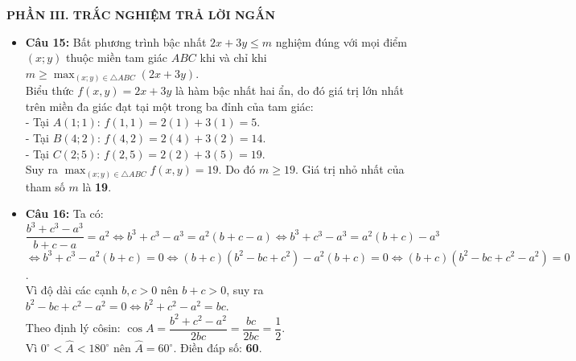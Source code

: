 \documentclass[12pt,a4paper]{article}
\begin{document}
\vspace{0.2cm}
\textbf{PHẦN III. TRẮC NGHIỆM TRẢ LỜI NGẮN}
\begin{itemize}[leftmargin=0.6cm]
    \item \textbf{Câu 15:} Bất phương trình bậc nhất $2x + 3y \le m$ nghiệm đúng với mọi điểm $(x; y)$ thuộc miền tam giác $ABC$ khi và chỉ khi $m \ge \max_{(x; y) \in \triangle ABC} (2x + 3y)$.\\
    Biểu thức $f(x, y) = 2x + 3y$ là hàm bậc nhất hai ẩn, do đó giá trị lớn nhất trên miền đa giác đạt tại một trong ba đỉnh của tam giác:\\
    - Tại $A(1; 1)$: $f(1, 1) = 2(1) + 3(1) = 5$.\\
    - Tại $B(4; 2)$: $f(4, 2) = 2(4) + 3(2) = 14$.\\
    - Tại $C(2; 5)$: $f(2, 5) = 2(2) + 3(5) = 19$.\\
    Suy ra $\max_{(x; y) \in \triangle ABC} f(x, y) = 19$. Do đó $m \ge 19$. Giá trị nhỏ nhất của tham số $m$ là \textbf{19}.

    \item \textbf{Câu 16:} Ta có:
    $\dfrac{b^3 + c^3 - a^3}{b + c - a} = a^2 \iff b^3 + c^3 - a^3 = a^2(b + c - a) \iff b^3 + c^3 - a^3 = a^2(b + c) - a^3$\\
    $\iff b^3 + c^3 - a^2(b + c) = 0 \iff (b + c)(b^2 - bc + c^2) - a^2(b + c) = 0 \iff (b + c)(b^2 - bc + c^2 - a^2) = 0$.\\
    Vì độ dài các cạnh $b, c > 0$ nên $b + c > 0$, suy ra $b^2 - bc + c^2 - a^2 = 0 \iff b^2 + c^2 - a^2 = bc$.\\
    Theo định lý côsin: $\cos A = \dfrac{b^2 + c^2 - a^2}{2bc} = \dfrac{bc}{2bc} = \dfrac{1}{2}$.\\
    Vì $0^\circ < \widehat{A} < 180^\circ$ nên $\widehat{A} = 60^\circ$. Điền đáp số: \textbf{60}.


\end{itemize}
\end{document}

